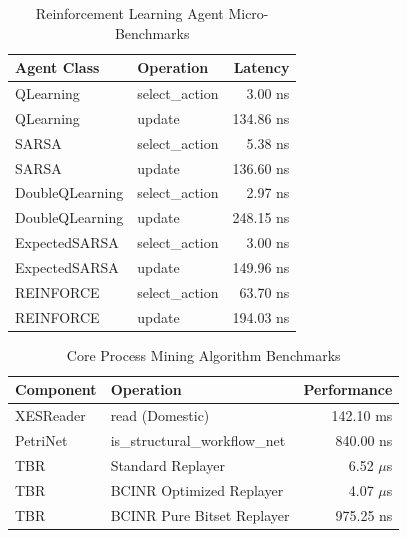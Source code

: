\begin{table}[ht]
\centering
\begin{tabular}{llr}
\toprule
Agent Class & Operation & Latency \\
\midrule
QLearning & select\_action & 3.00 ns \\
QLearning & update & 134.86 ns \\
SARSA & select\_action & 5.38 ns \\
SARSA & update & 136.60 ns \\
DoubleQLearning & select\_action & 2.97 ns \\
DoubleQLearning & update & 248.15 ns \\
ExpectedSARSA & select\_action & 3.00 ns \\
ExpectedSARSA & update & 149.96 ns \\
REINFORCE & select\_action & 63.70 ns \\
REINFORCE & update & 194.03 ns \\
\bottomrule
\end{tabular}
\caption{Reinforcement Learning Agent Micro-Benchmarks}
\label{tab:agent_performance}
\end{table}

\begin{table}[ht]
\centering
\begin{tabular}{llr}
\toprule
Component & Operation & Performance \\
\midrule
XESReader & read (Domestic) & 142.10 ms \\
PetriNet & is\_structural\_workflow\_net & 840.00 ns \\
TBR & Standard Replayer & 6.52 $\mu$s \\
TBR & BCINR Optimized Replayer & 4.07 $\mu$s \\
TBR & BCINR Pure Bitset Replayer & 975.25 ns \\
\bottomrule
\end{tabular}
\caption{Core Process Mining Algorithm Benchmarks}
\label{tab:algo_performance}
\end{table}
